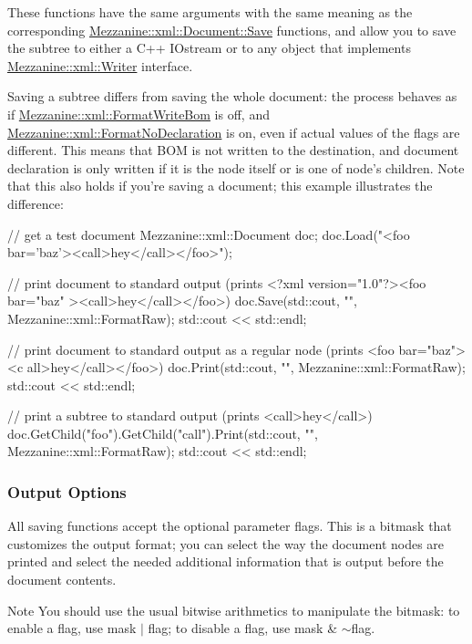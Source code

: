  These functions have the same arguments with the same meaning as the corresponding \hyperlink{classMezzanine_1_1xml_1_1Document_a6aaf5e93d8a80a7a7b99134cb7d993f4}{Mezzanine::xml::Document::Save} functions, and allow you to save the subtree to either a C++ IOstream or to any object that implements \hyperlink{classMezzanine_1_1xml_1_1Writer}{Mezzanine::xml::Writer} interface. \par
 \par
 Saving a subtree differs from saving the whole document: the process behaves as if \hyperlink{namespaceMezzanine_1_1xml_a984338522c305d986b8fa5a3818bf338}{Mezzanine::xml::FormatWriteBom} is off, and \hyperlink{namespaceMezzanine_1_1xml_a24412cfad59b402e85cbe6ad5093917a}{Mezzanine::xml::FormatNoDeclaration} is on, even if actual values of the flags are different. This means that BOM is not written to the destination, and document declaration is only written if it is the node itself or is one of node's children. Note that this also holds if you're saving a document; this example illustrates the difference: 
\begin{DoxyCode}
 // get a test document
 Mezzanine::xml::Document doc;
 doc.Load("<foo bar='baz'><call>hey</call></foo>");

 // print document to standard output (prints <?xml version="1.0"?><foo bar="baz"
      ><call>hey</call></foo>)
 doc.Save(std::cout, "", Mezzanine::xml::FormatRaw);
 std::cout << std::endl;

 // print document to standard output as a regular node (prints <foo bar="baz"><c
      all>hey</call></foo>)
 doc.Print(std::cout, "", Mezzanine::xml::FormatRaw);
 std::cout << std::endl;

 // print a subtree to standard output (prints <call>hey</call>)
 doc.GetChild("foo").GetChild("call").Print(std::cout, "", 
      Mezzanine::xml::FormatRaw);
 std::cout << std::endl;
\end{DoxyCode}
 \hypertarget{XMLManual_XMLSavingOptions}{}\subsubsection{Output Options}\label{XMLManual_XMLSavingOptions}
All saving functions accept the optional parameter flags. This is a bitmask that customizes the output format; you can select the way the document nodes are printed and select the needed additional information that is output before the document contents. \begin{DoxyNote}{Note}
You should use the usual bitwise arithmetics to manipulate the bitmask: to enable a flag, use mask $|$ flag; to disable a flag, use mask \& $\sim$flag.
\end{DoxyNote}
